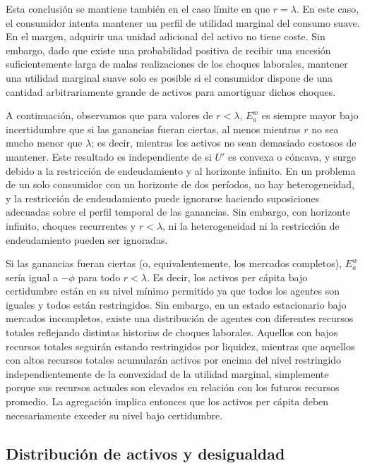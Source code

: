 \documentclass[a4paper,12pt]{article}
\begin{document}
Esta conclusión se mantiene también en el caso límite en que $r = \lambda$. En este caso, el consumidor intenta mantener un perfil de utilidad marginal del consumo suave. En el margen, adquirir una unidad adicional del activo no tiene coste. Sin embargo, dado que existe una probabilidad positiva de recibir una sucesión suficientemente larga de malas realizaciones de los choques laborales, mantener una utilidad marginal suave solo es posible si el consumidor dispone de una cantidad arbitrariamente grande de activos para amortiguar dichos choques.

A continuación, observamos que para valores de $r < \lambda$, $E_a^w$ es siempre mayor bajo incertidumbre que si las ganancias fueran ciertas, al menos mientras $r$ no sea mucho menor que $\lambda$; es decir, mientras los activos no sean demasiado costosos de mantener. Este resultado es independiente de si $U'$ es convexa o cóncava, y surge debido a la restricción de endeudamiento y al horizonte infinito. En un problema de un solo consumidor con un horizonte de dos períodos, no hay heterogeneidad, y la restricción de endeudamiento puede ignorarse haciendo suposiciones adecuadas sobre el perfil temporal de las ganancias. Sin embargo, con horizonte infinito, choques recurrentes y $r < \lambda$, ni la heterogeneidad ni la restricción de endeudamiento pueden ser ignoradas.

Si las ganancias fueran ciertas (o, equivalentemente, los mercados completos), $E_a^w$ sería igual a $-\phi$ para todo $r < \lambda$. Es decir, los activos per cápita bajo certidumbre están en su nivel mínimo permitido ya que todos los agentes son iguales y todos están restringidos. Sin embargo, en un estado estacionario bajo mercados incompletos, existe una distribución de agentes con diferentes recursos totales reflejando distintas historias de choques laborales. Aquellos con bajos recursos totales seguirán estando restringidos por liquidez, mientras que aquellos con altos recursos totales acumularán activos por encima del nivel restringido independientemente de la convexidad de la utilidad marginal, simplemente porque sus recursos actuales son elevados en relación con los futuros recursos promedio. La agregación implica entonces que los activos per cápita deben necesariamente exceder su nivel bajo certidumbre.



\subsection{Distribución de activos y desigualdad}
\end{document}
